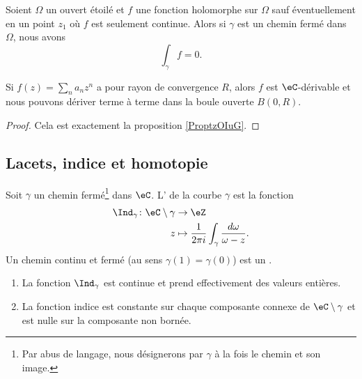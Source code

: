 \begin{proposition}   \label{PrpopwQSbJg}
    Soient \( \Omega\) un ouvert étoilé et \( f\) une fonction holomorphe sur \( \Omega\) sauf éventuellement en un point \( z_1\) où \( f\) est seulement continue. Alors si \( \gamma\) est un chemin fermé dans \( \Omega\), nous avons
    \begin{equation}
        \int_{\gamma}f=0.
    \end{equation}
\end{proposition}

\begin{proposition}     \label{PropRZCKeO}
    Si \( f(z)=\sum_na_nz^n\) a pour rayon de convergence \( R\), alors \( f\) est $\eC$-dérivable et nous pouvons dériver terme à terme dans la boule ouverte \( B(0,R)\).
\end{proposition}

\begin{proof}
    Cela est exactement la proposition \ref{ProptzOIuG}.
\end{proof}

\subsection{Lacets, indice et homotopie}

\begin{propositionDef}      \label{DEFooLFBNooGlvJmp} 
    Soit \( \gamma\) un chemin fermé\footnote{Par abus de langage, nous désignerons par \( \gamma\) à la fois le chemin et son image.} dans \( \eC\). L' de la courbe \( \gamma\) est la fonction
    \begin{equation}
        \begin{aligned}
            \Ind_{\gamma}\colon \eC\setminus \gamma&\to \eZ \\
            z&\mapsto \frac{1}{ 2\pi i }\int_{\gamma}\frac{ d\omega }{ \omega-z }. 
        \end{aligned}
    \end{equation}
    Un chemin continu et fermé (au sens \( \gamma(1)=\gamma(0)\)) est un .
    \begin{enumerate}
        \item
            La fonction \( \Ind_{\gamma}\) est continue et prend effectivement des valeurs entières.
        \item
            La fonction indice est constante sur chaque composante connexe de \( \eC\setminus \gamma\) et est nulle sur la composante non bornée.
    \end{enumerate}
\end{propositionDef}

